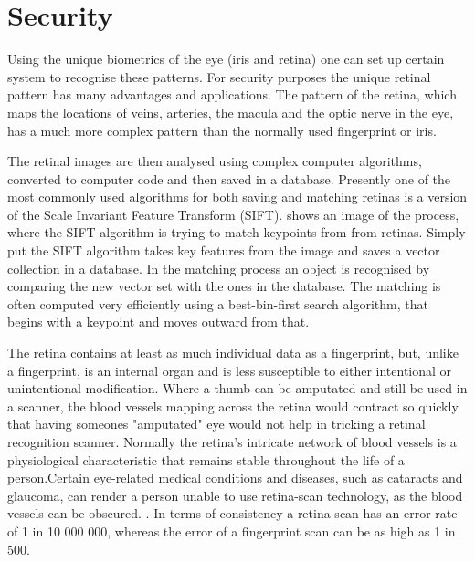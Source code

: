 
\section{Security}

Using the unique biometrics of the eye (iris and retina) one can set up certain system
to recognise these patterns. For security purposes the unique retinal pattern has many
advantages and applications. The pattern of the retina, which maps the locations of veins,
arteries, the macula and the optic nerve in the eye, has a much more complex pattern than
the normally used fingerprint or iris.\cite{ortega_2009} 

The retinal images are then analysed using complex computer algorithms, converted to
computer code and then saved in a database. Presently one of the most commonly used
algorithms for both saving and matching retinas is a version of the Scale Invariant
Feature Transform (SIFT).  shows an image of the process, where the
SIFT-algorithm is trying to match keypoints from from retinas. Simply put the SIFT
algorithm takes key features from the image and saves a vector collection in a database.
In the matching process an object is recognised by comparing the new vector set with
the ones in the database. The matching is often computed very efficiently using a
best-bin-first search algorithm, that begins with a keypoint and moves outward from that. 


The retina contains at least as much individual data as a fingerprint, but, unlike
a fingerprint, is an internal organ and is less susceptible to either intentional
or unintentional modification. Where a thumb can be amputated and still be used in
a scanner, the blood vessels mapping across the retina would contract so quickly
that having someones "amputated" eye would not help in tricking a retinal recognition
scanner. Normally the retina’s intricate network of blood vessels is a physiological
characteristic that remains stable throughout the life of a person.Certain eye-related
medical conditions and diseases, such as cataracts and glaucoma, can render a person
unable to use retina-scan technology, as the blood vessels can be obscured.
\cite{rarr_2015}.  In terms of consistency a retina scan has an error rate of
1 in 10 000 000, whereas the error of a fingerprint scan can be as high as 1 in 500.

